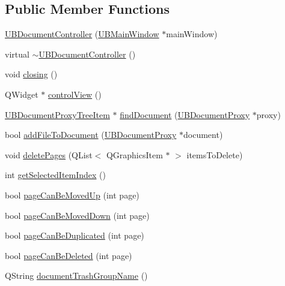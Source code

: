 \subsection*{Public Member Functions}
\begin{DoxyCompactItemize}
\item 
\hyperlink{class_u_b_document_controller_a38e9ea0a2dad2b1c8d9588563e9ee3bf}{U\-B\-Document\-Controller} (\hyperlink{class_u_b_main_window}{U\-B\-Main\-Window} $\ast$main\-Window)
\item 
virtual \hyperlink{class_u_b_document_controller_ac2cd0b1261b008ec6cda05073ae752ca}{$\sim$\-U\-B\-Document\-Controller} ()
\item 
void \hyperlink{class_u_b_document_controller_a9d81934600570ee50be364c33d5478e0}{closing} ()
\item 
Q\-Widget $\ast$ \hyperlink{class_u_b_document_controller_abf8464ae901a12f1354e48e06fb33daf}{control\-View} ()
\item 
\hyperlink{class_u_b_document_proxy_tree_item}{U\-B\-Document\-Proxy\-Tree\-Item} $\ast$ \hyperlink{class_u_b_document_controller_a4efe81168639872d8b1f141b9a69a916}{find\-Document} (\hyperlink{class_u_b_document_proxy}{U\-B\-Document\-Proxy} $\ast$proxy)
\item 
bool \hyperlink{class_u_b_document_controller_abe96427082e132f7247cd3dda6e2b5ac}{add\-File\-To\-Document} (\hyperlink{class_u_b_document_proxy}{U\-B\-Document\-Proxy} $\ast$document)
\item 
void \hyperlink{class_u_b_document_controller_ac47e0182c9e5d2455472da574883c10b}{delete\-Pages} (Q\-List$<$ Q\-Graphics\-Item $\ast$ $>$ items\-To\-Delete)
\item 
int \hyperlink{class_u_b_document_controller_aeab6575b56726fd8da00299c78ef3269}{get\-Selected\-Item\-Index} ()
\item 
bool \hyperlink{class_u_b_document_controller_a392b1ad5ed947be4517c7791bb3c57f9}{page\-Can\-Be\-Moved\-Up} (int page)
\item 
bool \hyperlink{class_u_b_document_controller_af383db396f8d772663ce6ed7d0fbd019}{page\-Can\-Be\-Moved\-Down} (int page)
\item 
bool \hyperlink{class_u_b_document_controller_aa780a0f6de4bceda2086bf5616b8ce1d}{page\-Can\-Be\-Duplicated} (int page)
\item 
bool \hyperlink{class_u_b_document_controller_a71a7cb4fcf2ea80c51d03126eb2845db}{page\-Can\-Be\-Deleted} (int page)
\item 
Q\-String \hyperlink{class_u_b_document_controller_a5319bbd30cd28fe66d5b7e5fde07554b}{document\-Trash\-Group\-Name} ()

\end{DoxyCompactItemize}
